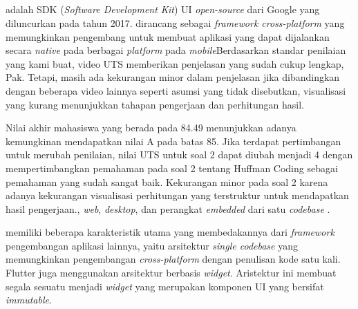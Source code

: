 \subsection{\flutter}
\label{subsec:flutter}

\flutter{} adalah SDK (\emph{Software Development Kit}) UI \emph{open-source} dari Google yang diluncurkan pada tahun 2017. \flutter{} dirancang sebagai \emph{framework cross-platform} yang memungkinkan pengembang untuk membuat aplikasi yang dapat dijalankan secara \emph{native} pada berbagai \emph{platform} pada \emph{mobile}Berdasarkan standar penilaian yang kami buat, video UTS memberikan penjelasan yang sudah cukup lengkap, Pak. Tetapi, masih ada kekurangan minor dalam penjelasan jika dibandingkan dengan beberapa video lainnya seperti asumsi yang tidak disebutkan, visualisasi yang kurang menunjukkan tahapan pengerjaan dan perhitungan hasil. 

Nilai akhir mahasiswa yang berada pada 84.49 menunjukkan adanya kemungkinan mendapatkan nilai A pada batas 85. 
Jika terdapat pertimbangan untuk merubah penilaian, nilai UTS untuk soal 2 dapat diubah menjadi 4 dengan mempertimbangkan pemahaman pada soal 2 tentang Huffman Coding sebagai pemahaman yang sudah sangat baik. Kekurangan minor pada soal 2 karena adanya kekurangan visualisasi perhitungan yang terstruktur untuk mendapatkan hasil pengerjaan., \emph{web}, \emph{desktop}, dan perangkat \emph{embedded} dari satu \emph{codebase} \parencite{flutter2021}.

\flutter{} memiliki beberapa karakteristik utama yang membedakannya dari \emph{framework} pengembangan aplikasi lainnya, yaitu arsitektur \emph{single codebase} yang memungkinkan pengembangan \emph{cross-platform} dengan penulisan kode satu kali. Flutter juga menggunakan arsitektur berbasis \emph{widget}. Aristektur ini membuat segala sesuatu menjadi \emph{widget} yang merupakan komponen UI yang bersifat \emph{immutable}. 



